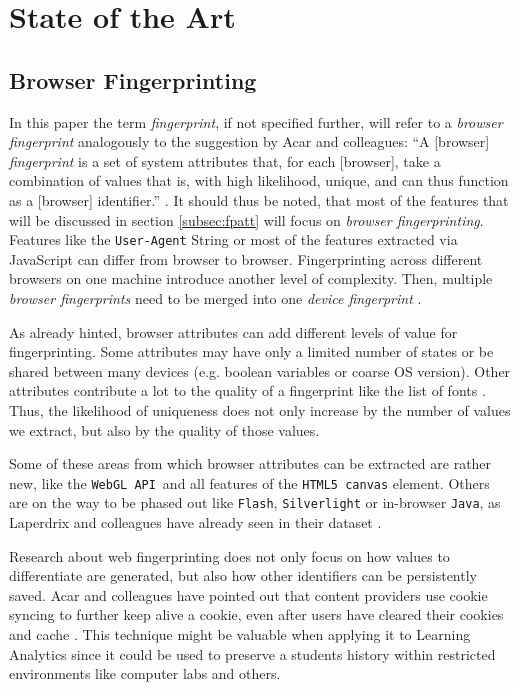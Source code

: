 \section{State of the Art} %
\label{sec:sota}



\subsection{Browser Fingerprinting}

In this paper the term \textit{fingerprint}, if not specified further, will refer to a \textit{browser fingerprint} analogously to the suggestion by Acar and colleagues: ``A [browser] \textit{fingerprint} is a set of system attributes that, for each [browser], take a combination of values that is, with high likelihood, unique, and can thus function as a [browser] identifier.'' \cite{acar_fpdetective_2013}. It should thus be noted, that most of the features that will be discussed in section \ref{subsec:fpatt} will focus on \textit{browser fingerprinting}. Features like the \texttt{User-Agent} String or most of the features extracted via JavaScript can differ from browser to browser. Fingerprinting across different browsers on one machine introduce another level of complexity. Then, multiple \textit{browser fingerprints} need to be merged into one \textit{device fingerprint} \cite{cao_cross-browser_2017}.

As already hinted, browser attributes can add different levels of value for fingerprinting. Some attributes may have only a limited number of states or be shared between many devices (e.g. boolean variables or coarse OS version). Other attributes contribute a lot to the quality of a fingerprint like the list of fonts \cite{acar_fpdetective_2013,laperdrix_beauty_2016}. Thus, the likelihood of uniqueness does not only increase by the number of values we extract, but also by the quality of those values. 

Some of these areas from which browser attributes can be extracted are rather new, like the \texttt{WebGL API} and all features of the \texttt{HTML5 canvas} element. Others are on the way to be phased out like \texttt{Flash}, \texttt{Silverlight} or in-browser \texttt{Java}, as Laperdrix and colleagues have already seen in their dataset \cite{laperdrix_beauty_2016}.

Research about web fingerprinting does not only focus on how values to differentiate are generated, but also how other identifiers can be persistently saved. Acar and colleagues have pointed out that content providers use cookie syncing to further keep alive a cookie, even after users have cleared their cookies and cache \cite{acar_web_2014}. This technique might be valuable when applying it to Learning Analytics since it could be used to preserve a students history within restricted environments like computer labs and others.

